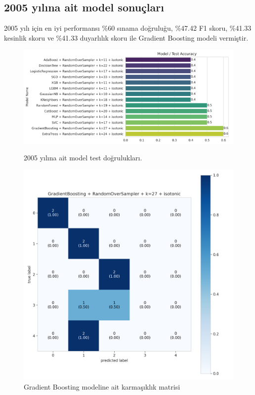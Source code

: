 \newpage

\subsection{2005 yılına ait model sonuçları}
2005 yılı için en iyi performansı \%60 sınama doğruluğu,  \%47.42 F1 skoru, \%41.33 kesinlik skoru ve \%41.33 duyarlılık skoru ile Gradient Boosting modeli vermiştir.

\begin{figure}[ht]
\centering
\begin{minipage}[b]{0.6\textwidth}
    \centering
    \includegraphics[width=\textwidth]{2005.png}
    \caption{2005 yılına ait model test doğrulukları.}
    \label{fig:resim1}
\end{minipage}
\hfill
\begin{minipage}[b]{0.6\textwidth}
    \centering
    \includegraphics[width=\textwidth]{2005_cm.png}
    \caption{Gradient Boosting modeline ait karmaşıklık matrisi}
    \label{fig:resim2}
\end{minipage}
\end{figure}

